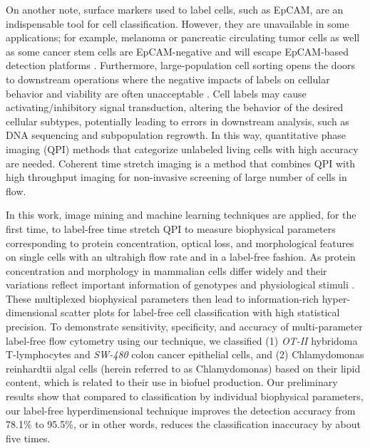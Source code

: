 \documentclass[aps,pra,reprint,longbibliography,superscriptaddress]{revtex4-1}
\begin{document}
On another note, surface markers used to label cells, such as EpCAM, are an indispensable tool for cell classification. However, they are unavailable in some applications; for example, melanoma or pancreatic circulating tumor cells as well as some cancer stem cells are EpCAM-negative and will escape EpCAM-based detection platforms \cite{kling2012beyond}. Furthermore, large-population cell sorting opens the doors to downstream operations where the negative impacts of labels on cellular behavior and viability are often unacceptable \cite{boddington2011labeling}. Cell labels may cause activating/inhibitory signal transduction, altering the behavior of the desired cellular subtypes, potentially leading to errors in downstream analysis, such as DNA sequencing and subpopulation regrowth. In this way, quantitative phase imaging (QPI) methods \cite{ikeda2005hilbert,popescu2011quantitative,pham2013real} that categorize unlabeled living cells with high accuracy are needed. Coherent time stretch imaging is a method that combines QPI with high throughput imaging for non-invasive screening of large number of cells in flow.

In this work, image mining and machine learning techniques are applied, for the first time, to label-free time stretch QPI to measure biophysical parameters corresponding to protein concentration, optical loss, and morphological features on single cells with an ultrahigh flow rate and in a label-free fashion. As protein concentration and morphology in mammalian cells differ widely \cite{feinerman2008variability, sigal2006variability, friebel1999optical, vona2000isolation} and their variations reflect important information of genotypes and physiological stimuli \cite{spencer2009non}. These multiplexed biophysical parameters then lead to information-rich hyper-dimensional scatter plots for label-free cell classification with high statistical precision. To demonstrate sensitivity, specificity, and accuracy of multi-parameter label-free flow cytometry using our technique, we classified (1) \textit{OT-II} hybridoma T-lymphocytes and \textit{SW-480} colon cancer epithelial cells, and (2) Chlamydomonas reinhardtii algal cells (herein referred to as Chlamydomonas) based on their lipid content, which is related to their use in biofuel production. Our preliminary results show that compared to classification by individual biophysical parameters, our label-free hyperdimensional technique improves the detection accuracy from 78.1\% to 95.5\%, or in other words, reduces the classification inaccuracy by about five times. 
\end{document}
